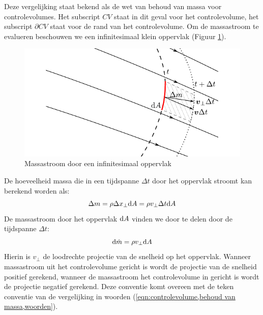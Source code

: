 Deze vergelijking staat bekend als de wet van behoud van massa voor controlevolumes. Het subscript $CV$ staat in dit geval voor het controlevolume, het subscript $\partial CV$ staat voor de rand van het controlevolume.
Om de massastroom te evalueren beschouwen we een infinitesimaal klein oppervlak (Figuur \ref{fig:massastroom}).
\begin{figure}[htb]
	\centering
	\includegraphics{fig/controlevolumes/massastroom}
	\caption{Massastroom door een infinitesimaal oppervlak}
	\label{fig:massastroom}
\end{figure}
De hoeveelheid massa die in een tijdspanne $\Delta t$ door het oppervlak stroomt kan berekend worden als:
\begin{equation}
	\Delta m = \rho \Delta x_{\perp} \mathrm{d} A = \rho v_{\perp} \Delta t \mathrm{d} A
	\label{eqn:hoeveelheid massa door een oppervlak}
\end{equation}
De massastroom door het oppervlak $\mathrm{d} A$ vinden we door te delen door de tijdspanne $\Delta t$:
\begin{equation}
	\mathrm{d} \dot{m}  = \rho v_{\perp} \mathrm{d} A
	\label{eqn:massastroom}
\end{equation}
Hierin is $v_{\perp}$ de loodrechte projectie van de snelheid op het oppervlak. Wanneer massastroom uit het controlevolume gericht is wordt de projectie van de snelheid positief gerekend, wanneer de massastroom het controlevolume in gericht is wordt de projectie negatief gerekend. Deze conventie komt overeen met de teken conventie van de vergelijking in woorden (\ref{eqn:controlevolume,behoud van massa,woorden}).

